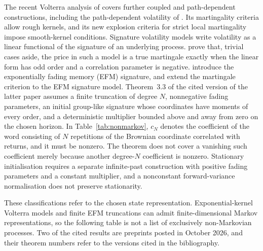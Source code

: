 \documentclass[11pt,a4paper]{article}
\theoremstyle{definition}
\theoremstyle{remark}
\begin{document}
The recent Volterra analysis of \citet{GuyonJeanninJourdain2026} covers further coupled and path-dependent constructions, including the path-dependent volatility of \citet{GuyonLekeufack2023}. Its martingality criteria allow rough kernels, and its new explosion criteria for strict local martingality impose smooth-kernel conditions. Signature volatility models \citep{CuchieroGazzaniSvalutoFerro2023} write volatility as a linear functional of the signature of an underlying process. \citet{AbiJaberGassiatSotnikov2025} prove that, trivial cases aside, the price in such a model is a true martingale exactly when the linear form has odd order and a correlation parameter is negative. \citet{AbiJaberSotnikov2025} introduce the exponentially fading memory (EFM) signature, and \citet{SotnikovViot2026} extend the martingale criterion to the EFM signature model. Theorem~3.3 of the cited version of the latter paper assumes a finite truncation of degree \(N\), nonnegative fading parameters, an initial group-like signature whose coordinates have moments of every order, and a deterministic multiplier bounded above and away from zero on the chosen horizon. In Table~\ref{tab:nonmarkov}, \(c_N\) denotes the coefficient of the word consisting of \(N\) repetitions of the Brownian coordinate correlated with returns, and it must be nonzero. The theorem does not cover a vanishing such coefficient merely because another degree-\(N\) coefficient is nonzero. Stationary initialisation requires a separate infinite-past construction with positive fading parameters and a constant multiplier, and a nonconstant forward-variance normalisation does not preserve stationarity.

These classifications refer to the chosen state representation. Exponential-kernel Volterra models and finite EFM truncations can admit finite-dimensional Markov representations, so the following table is not a list of exclusively non-Markovian processes. Two of the cited results are preprints posted in October 2026, and their theorem numbers refer to the versions cited in the bibliography.
\end{document}
